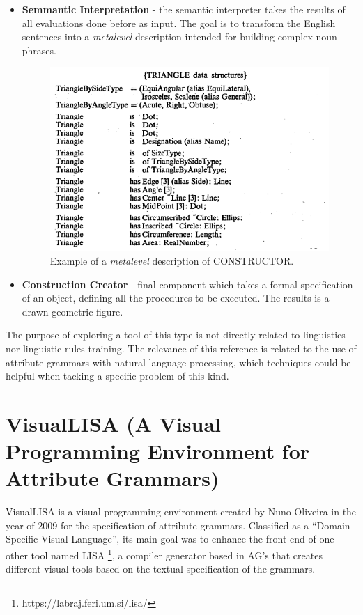 \begin{itemize}
\newpage
\item \textbf{Semmantic Interpretation} - the semantic interpreter takes the results of all evaluations done before as input.
The goal is to transform the English sentences into a \textit{metalevel} description intended for building complex noun phrases.
\begin{figure}[h]
\centering
\includegraphics[width=12cm]{images/constructor_metalevel_desc.png}
\caption{Example of a \textit{metalevel} description of CONSTRUCTOR.}
\label{fig:constructorMetalevelDesc}
\end{figure}

\item \textbf{Construction Creator} - final component which takes a formal specification of an object, defining all the procedures to be executed.
The results is a drawn geometric figure.
\end{itemize}

The purpose of exploring a tool of this type is not directly related to linguistics nor linguistic rules training.
The relevance of this reference is related to the use of attribute grammars with natural language processing, which techniques could be helpful when tacking a specific problem of this kind.


\section{VisualLISA (A Visual Programming Environment for Attribute Grammars)}
VisualLISA is a visual programming environment created by Nuno Oliveira in the year of 2009 \cite{oliveira_2009} for the specification of attribute grammars. 
Classified as a ``Domain Specific  Visual Language'', its main goal was to enhance the front-end of one other tool named LISA \footnote{https://labraj.feri.um.si/lisa/}, 
a compiler generator based in AG's that creates different visual tools based on the textual specification of the grammars.

